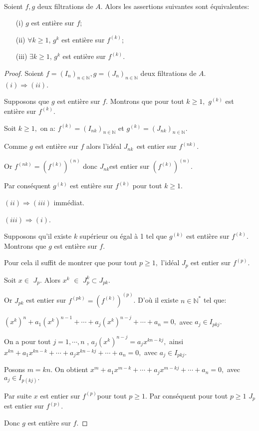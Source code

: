 \begin{maproposition} \cite{Di2} \\
	Soient $f,g$ deux filtrations de $A$. Alors les assertions suivantes sont équivalentes:
	\begin{enumerate}
		\item[(i)] $g$ est entière sur $f$;
		\item[(ii)] $\forall k \geqslant 1$, $g^{k}$ est entière sur $f^{(k)}$;
		\item[(iii)] $\exists k \geqslant 1$, $g^{k}$ est entière sur $f^{(k)}$.
	\end{enumerate}
\end{maproposition}
\begin{proof}
	Soient $f=(I_n)_{n \in \mathbb{N}},g=(J_n)_{n \in \mathbb{N}}$ deux filtrations de $A$. \\
	$(i)\Longrightarrow (ii)$.
	
	Supposons que $g$ est entière sur $f.$ Montrons que pour tout $k\geq 1,$ $g^{(k)}$ est entière sur $f^{(k)}.$
	
	Soit $k\geq 1,$ on a: $f^{(k)}=(I_{nk})_{n\in \mathbb{N}}$ et $g^{(k)}=(J_{nk})_{n\in \mathbb{N}}$.
	
	Comme $g$ est entière sur $f$ alors l'idéal $J_{nk\text{ }}$est entier sur $f^{(nk)}.$
	
	Or $f^{(nk)}=(f^{(k)})^{(n)}$ donc $J_{nk}$est entier sur $(f^{(k)})^{(n)}.$
	
	Par conséquent $g^{(k)}$ est entière sur $f^{(k)}$ pour tout $k\geq 1.$
	
	$(ii)\Longrightarrow (iii)$ immédiat.
	
	$(iii)\Longrightarrow (i)$.
	
	Supposons qu'il existe $k$ supérieur ou égal à 1 tel que $g^{(k)}$ est entière sur $f^{(k)}$. Montrons que $g$ est entière sur $f.$
	
	Pour cela il suffit de montrer que pour tout $p\geq 1,$ l'idéal $J_{p}$ est entier sur $f^{(p)}.$
	
	Soit $x\in $ $J_{p}.$ Alors $x^{k}$ $\in $ $J_{p}^{k}\subset J_{pk}.$
	
	Or $J_{pk}$ est entier sur $f^{(pk)}=(f^{(k)})^{(p)}$. D'où il existe $n\in \mathbb{N}^{\ast }$ tel que:
	
	$(x^{k})^{n}+a_{1}(x^{k})^{n-1}+\cdots +a_{j}(x^{k})^{n-j}+\cdots +a_{n}=0,$ avec $a_{j}\in I_{pkj}.$
	
	On a pour tout $j=1,\cdots ,n$ , $a_{j}(x^{k})^{n-j}=a_{j}x^{kn-kj},$ ainsi $x^{kn}+a_{1}x^{kn-k}+\cdots +a_{j}x^{kn-kj}+\cdots +a_{n}=0,$ avec $a_{j}\in I_{pkj}.$
	
	Posons $m=kn.$ On obtient $x^{m}+a_{1}x^{m-k}+\cdots +a_{j}x^{m-kj}+\cdots +a_{n}=0,$ avec $a_{j}\in I_{p(kj)}.$
	
	Par suite $x$ est entier sur $f^{(p)}$pour tout $p\geq 1.$ Par conséquent pour tout $p\geq 1$ $J_{p}$ est entier sur $f^{(p)}.$
	
	Donc $g$ est entière sur $f.$
	
\end{proof}

